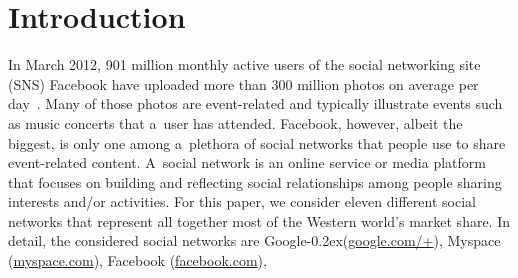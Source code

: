 \documentclass[runningheads,a4paper]{llncs}
\newcommand{\googleplus}{Google\nolinebreak\hspace{0em}\raisebox{.28ex}{\tiny\bf +}\kern-0.2ex\xspace}
\begin{document}



\section{Introduction}                                                      \label{sec:introduction}
In March 2012, 901 million monthly active users of the social networking site (SNS) Facebook have uploaded more than 300 million photos on average per day~\cite{Facebook2012}. Many of those photos are event-related and typically illustrate events such as music concerts that a~user has attended. Facebook, however, albeit the biggest, is only one among a~plethora of social networks that people use to share event-related content.
A~social network is an online service or media platform that focuses on building and reflecting social relationships among people sharing interests and/or activities. For this paper, we consider eleven different social networks that represent all together most of the Western world's market share. In detail, the considered social networks are
\googleplus (\url{google.com/+}),
Myspace (\url{myspace.com}),
Facebook (\url{facebook.com}),
\end{document}
